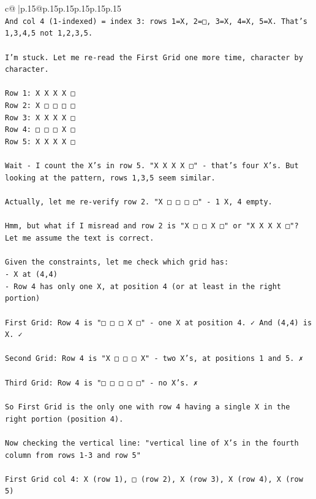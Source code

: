 \documentclass{article}
\begin{document}
{\begin{supertabular}{c@{$\;$}|p{.15\linewidth}@{}p{.15\linewidth}p{.15\linewidth}p{.15\linewidth}p{.15\linewidth}p{.15\linewidth}}
{{{\\ 
\texttt{And col 4 (1{-}indexed) = index 3: rows 1=X, 2=□, 3=X, 4=X, 5=X. That's 1,3,4,5 not 1,2,3,5.} \\
\\ 
\texttt{I'm stuck. Let me re{-}read the First Grid one more time, character by character.} \\
\\ 
\texttt{Row 1: X X X X □} \\
\texttt{Row 2: X □ □ □ □} \\
\texttt{Row 3: X X X X □} \\
\texttt{Row 4: □ □ □ X □} \\
\texttt{Row 5: X X X X □} \\
\\ 
\texttt{Wait {-} I count the X's in row 5. "X X X X □" {-} that's four X's. But looking at the pattern, rows 1,3,5 seem similar.} \\
\\ 
\texttt{Actually, let me re{-}verify row 2. "X □ □ □ □" {-} 1 X, 4 empty.} \\
\\ 
\texttt{Hmm, but what if I misread and row 2 is "X □ □ X □" or "X X X X □"? Let me assume the text is correct.} \\
\\ 
\texttt{Given the constraints, let me check which grid has:} \\
\texttt{{-} X at (4,4)} \\
\texttt{{-} Row 4 has only one X, at position 4 (or at least in the right portion)} \\
\\ 
\texttt{First Grid: Row 4 is "□ □ □ X □" {-} one X at position 4. ✓ And (4,4) is X. ✓} \\
\\ 
\texttt{Second Grid: Row 4 is "X □ □ □ X" {-} two X's, at positions 1 and 5. ✗} \\
\\ 
\texttt{Third Grid: Row 4 is "□ □ □ □ □" {-} no X's. ✗} \\
\\ 
\texttt{So First Grid is the only one with row 4 having a single X in the right portion (position 4).} \\
\\ 
\texttt{Now checking the vertical line: "vertical line of X's in the fourth column from rows 1{-}3 and row 5"} \\
\\ 
\texttt{First Grid col 4: X (row 1), □ (row 2), X (row 3), X (row 4), X (row 5)} \\
}}}
\end{supertabular}}
\end{document}
